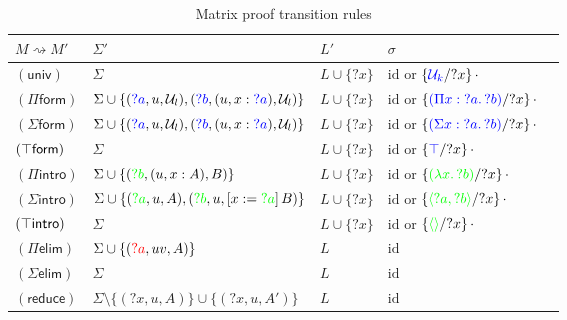 \documentclass[twoside]{report}
\begin{document}
\begin{table}
    \centering
    \begin{tabular}{lllll}\hline
    $M \rightsquigarrow M'$ & $\Sigma'$ & $L'$ & $\sigma$ \\
    \hline
    $(\mathsf{univ})$
        & $\Sigma$
        & $L \cup \{?x\}$
        & $\mathrm{id}$ or $\subst {?x} {\textcolor{blue}{\mathcal U_k}} {\cdot}$
        \\
    $(\Pi\mathsf{form})$
        & $\Sigma \cup \{(\textcolor{blue}{?a}, u, \mathcal U_l), (\textcolor{blue}{?b}, (u, x : \textcolor{blue}{?a}), \mathcal U_l)\}$
        & $L \cup \{?x\}$
        & $\mathrm{id}$ or $\subst {?x} {\textcolor{blue}{(\ppi x {?a} {?b})}} {\cdot}$
        \\
    $(\Sigma\mathsf{form})$
        & $\Sigma \cup \{(\textcolor{blue}{?a}, u, \mathcal U_l), (\textcolor{blue}{?b}, (u, x : \textcolor{blue}{?a}), \mathcal U_l)\}$
        & $L \cup \{?x\}$
        & $\mathrm{id}$ or $\subst {?x} {\textcolor{blue}{(\sig x {?a} {?b})}} {\cdot}$
        \\
    $(\unit\mathsf{form})$
        & $\Sigma$
        & $L \cup \{?x\}$
        & $\mathrm{id}$ or $\subst {?x} {\textcolor{blue}{\unit}} {\cdot}$
        \\
    $(\Pi\mathsf{intro})$
        & $\Sigma \cup \{(\textcolor{green}{?b}, (u, x : A), B)\}$
        & $L \cup \{?x\}$
        & $\mathrm{id}$ or $\subst {?x} {\textcolor{green}{(\lam x {?b})}} {\cdot}$
        \\
    $(\Sigma\mathsf{intro})$
        & $\Sigma \cup \{(\textcolor{green}{?a}, u, A), (\textcolor{green}{?b}, u, \llet x {\textcolor{green}{?a}} B)\}$
        & $L \cup \{?x\}$
        & $\mathrm{id}$ or $\subst {?x} {\textcolor{green}{\pair {?a} {?b}}} {\cdot}$
        \\
    $(\unit\mathsf{intro})$
        & $\Sigma$
        & $L \cup \{?x\}$
        & $\mathrm{id}$ or $\subst {?x} {\textcolor{green}{\sstar}} {\cdot}$
        \\
    $(\Pi\mathsf{elim})$
        & $\Sigma \cup \{(\textcolor{red}{?a}, uv, A)\}$
        & $L$
        & $\mathrm{id}$
        \\
    $(\Sigma\mathsf{elim})$
        & $\Sigma$
        & $L$
        & $\mathrm{id}$
        \\
    $(\mathsf{reduce})$
        & $\Sigma \setminus \{({?x}, u, A)\} \cup \{({?x}, u, A')\}$
        & $L$
        & $\mathrm{id}$
        \\
    \hline
    \end{tabular}
\caption{Matrix proof transition rules}
\label{tab:matrix_transitions}
\end{table}
\end{document}
